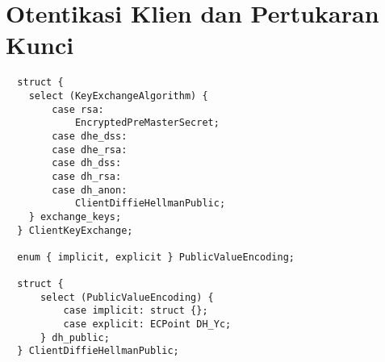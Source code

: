 \section{Otentikasi Klien dan Pertukaran Kunci}

\begin{verbatim}
  struct {
    select (KeyExchangeAlgorithm) {
        case rsa:
            EncryptedPreMasterSecret;
        case dhe_dss:
        case dhe_rsa:
        case dh_dss:
        case dh_rsa:
        case dh_anon:
            ClientDiffieHellmanPublic;
    } exchange_keys;
  } ClientKeyExchange;

  enum { implicit, explicit } PublicValueEncoding;

  struct {
      select (PublicValueEncoding) {
          case implicit: struct {};
          case explicit: ECPoint DH_Yc;
      } dh_public;
  } ClientDiffieHellmanPublic;


\end{verbatim}